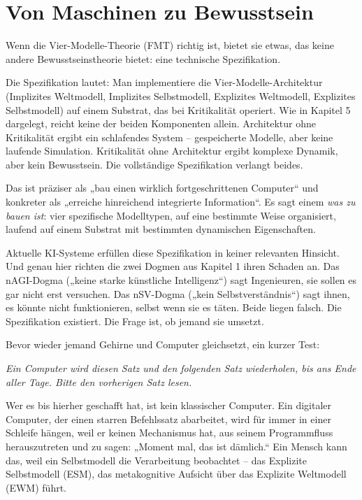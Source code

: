 \documentclass[11pt, twoside, openright]{book}
\begin{document}
\chapter{Von Maschinen zu Bewusstsein}

Wenn die Vier-Modelle-Theorie (FMT) richtig ist, bietet sie etwas, das keine andere Bewusstseinstheorie bietet: eine technische Spezifikation.

Die Spezifikation lautet: Man implementiere die Vier-Modelle-Architektur (Implizites Weltmodell, Implizites Selbstmodell, Explizites Weltmodell, Explizites Selbstmodell) auf einem Substrat, das bei Kritikalität operiert. Wie in Kapitel 5 dargelegt, reicht keine der beiden Komponenten allein. Architektur ohne Kritikalität ergibt ein schlafendes System -- gespeicherte Modelle, aber keine laufende Simulation. Kritikalität ohne Architektur ergibt komplexe Dynamik, aber kein Bewusstsein. Die vollständige Spezifikation verlangt beides.

Das ist präziser als „bau einen wirklich fortgeschrittenen Computer“ und konkreter als „erreiche hinreichend integrierte Information“. Es sagt einem \textit{was zu bauen ist}: vier spezifische Modelltypen, auf eine bestimmte Weise organisiert, laufend auf einem Substrat mit bestimmten dynamischen Eigenschaften.

Aktuelle KI-Systeme erfüllen diese Spezifikation in keiner relevanten Hinsicht. Und genau hier richten die zwei Dogmen aus Kapitel 1 ihren Schaden an. Das nAGI-Dogma („keine starke künstliche Intelligenz“) sagt Ingenieuren, sie sollen es gar nicht erst versuchen. Das nSV-Dogma („kein Selbstverständnis“) sagt ihnen, es könnte nicht funktionieren, selbst wenn sie es täten. Beide liegen falsch. Die Spezifikation existiert. Die Frage ist, ob jemand sie umsetzt.

Bevor wieder jemand Gehirne und Computer gleichsetzt, ein kurzer Test:

\textit{Ein Computer wird diesen Satz und den folgenden Satz wiederholen, bis ans Ende aller Tage. Bitte den vorherigen Satz lesen.}

Wer es bis hierher geschafft hat, ist kein klassischer Computer. Ein digitaler Computer, der einen starren Befehlssatz abarbeitet, wird für immer in einer Schleife hängen, weil er keinen Mechanismus hat, aus seinem Programmfluss herauszutreten und zu sagen: „Moment mal, das ist dämlich.“ Ein Mensch kann das, weil ein Selbstmodell die Verarbeitung beobachtet -- das Explizite Selbstmodell (ESM), das metakognitive Aufsicht über das Explizite Weltmodell (EWM) führt.
\end{document}
